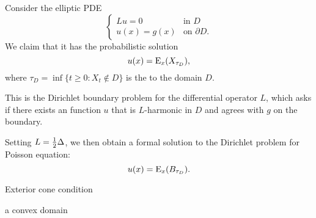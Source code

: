 \documentclass[10pt]{book}
\begin{document}
Consider the elliptic PDE \[
    \begin{cases}
        Lu = 0 & \text{in } D\\
        u(x) = g(x) & \text{on } \partial D.
    \end{cases}
\] We claim that it has the probabilistic solution \[
    u(x) = \mathop{}\!\mathrm{E}_x(X_{\tau_D}),
\] where $\tau_D = \inf\{t \geq 0 : X_t \notin D\}$ is the  to the domain $D$.

This is the Dirichlet boundary problem for the differential operator $L$, which asks if there exists an function $u$ that is $L$-harmonic in $D$ and agrees with $g$ on the boundary.

Setting $L = \tfrac{1}{2} \Delta$, we then obtain a formal solution to the Dirichlet problem for Poisson equation: 
\[
    u(x) = \mathop{}\!\mathrm{E}_x(B_{\tau_D}).
\]

Exterior cone condition

a convex domain






\appendix


\printbibliography[heading=bibintoc]

\setlength\columnsep{20pt}
\begin{multicols}{2}
    \printnomenclature
\end{multicols}

\printindex
\end{document}
